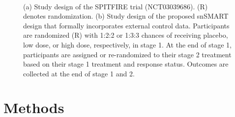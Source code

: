 \begin{figure}
\centering
{}
\\
\caption{(a) Study design of the SPITFIRE trial (NCT03039686). (R) denotes randomization. (b) Study design of the proposed snSMART design that formally incorporates external control data. Participants are randomized (R) with 1:2:2 or 1:3:3 chances of receiving placebo, low dose, or high dose, respectively, in stage 1. At the end of stage 1, participants are assigned or re-randomized to their stage 2 treatment based on their stage 1 treatment and response status. Outcomes are collected at the end of stage 1 and 2.}
\end{figure}




\section{Methods} \label{s:methods}
 

